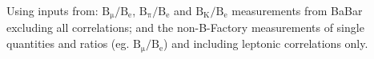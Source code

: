 \noindent Using inputs from: $\mathrm{B_\mu/B_e}$,  $\mathrm{B_\pi/B_e}$ and $\mathrm{B_K/B_e}$ measurements from BaBar excluding all correlations; and the non-B-Factory measurements of single quantities and ratios (eg. $\mathrm{B_\mu/B_e}$) and including leptonic correlations only.
